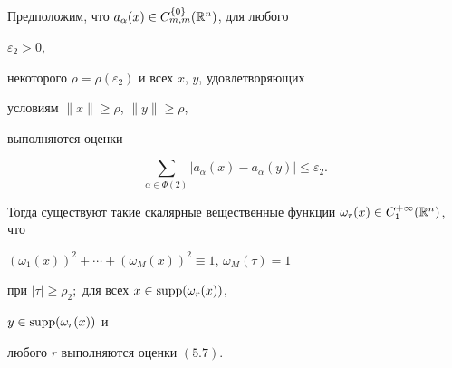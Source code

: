 

 


\begin{lems} 


Предположим, что $a_\alpha(x)\in C^{\{0\}}_{m,m}(\Bbb R^n)$, для любого 


$\varepsilon_2>0$, 


некоторого $\rho=\rho(\varepsilon_2)$ и всех $x$, $y$, удовлетворяющих 


условиям $\|x\|\ge\rho$, $\|y\|\ge\rho$, 


выполняются оценки 


\begin{equation} 


\sum_{\alpha\in\Phi(2)}|a_\alpha(x)-a_\alpha(y)|\le\varepsilon_2.


\end{equation} 


Тогда существуют такие скалярные вещественные функции $\omega_r(x)\in 


C^{+\infty}_1(\Bbb R^n)$, что 


$(\omega_1(x))^2+\dotsb+(\omega_M(x))^2\equiv1$, $\omega_M(\tau)=1$ 


при $|\tau|\ge\rho_2;$ для всех $x\in\operatorname{supp}(\omega_r(x))$, 


$y\in\operatorname{supp}(\omega_r(x))$ и 


любого $r$ выполняются оценки $(5.7)$. 


\end{lems} 


 


